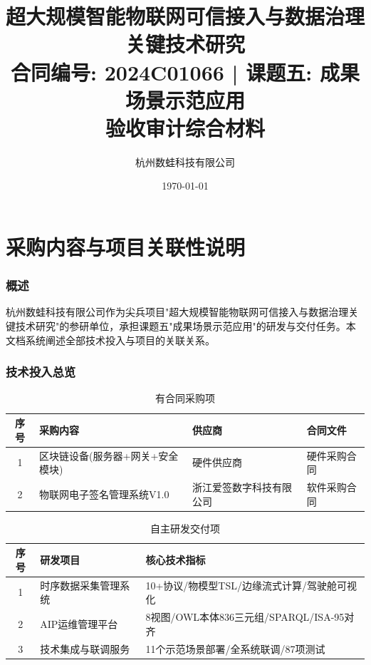 \documentclass[12pt,a4paper]{ctexart}
\title{{\heiti\zihao{2} 超大规模智能物联网可信接入与数据治理关键技术研究 \\[6pt]}
       {\kaishu\large 合同编号: 2024C01066 | 课题五: 成果场景示范应用} \\[12pt]
       {\heiti\zihao{3} 验收审计综合材料}}
\author{杭州数蛙科技有限公司}
\date{\today}
\begin{document}
\maketitle\thispagestyle{empty}\newpage
\tableofcontents\newpage

\part{采购内容与项目关联性说明}

\section{概述}
杭州数蛙科技有限公司作为尖兵项目"超大规模智能物联网可信接入与数据治理关键技术研究"的参研单位，承担课题五"成果场景示范应用"的研发与交付任务。本文档系统阐述全部技术投入与项目的关联关系。

\section{技术投入总览}
\begin{table}[H]\centering
\caption{有合同采购项}\begin{tabular}{@{}clll@{}}
\toprule
序号 & 采购内容 & 供应商 & 合同文件 \\
\midrule
1 & 区块链设备(服务器+网关+安全模块) & 硬件供应商 & 硬件采购合同 \\
2 & 物联网电子签名管理系统V1.0 & 浙江爱签数字科技有限公司 & 软件采购合同 \\
\bottomrule
\end{tabular}\end{table}

\begin{table}[H]\centering
\caption{自主研发交付项}\begin{tabular}{@{}cll@{}}
\toprule
序号 & 研发项目 & 核心技术指标 \\
\midrule
1 & 时序数据采集管理系统 & 10+协议/物模型TSL/边缘流式计算/驾驶舱可视化 \\
2 & AIP运维管理平台 & 8视图/OWL本体836三元组/SPARQL/ISA-95对齐 \\
3 & 技术集成与联调服务 & 11个示范场景部署/全系统联调/87项测试 \\
\bottomrule
\end{tabular}\end{table}
\end{document}
